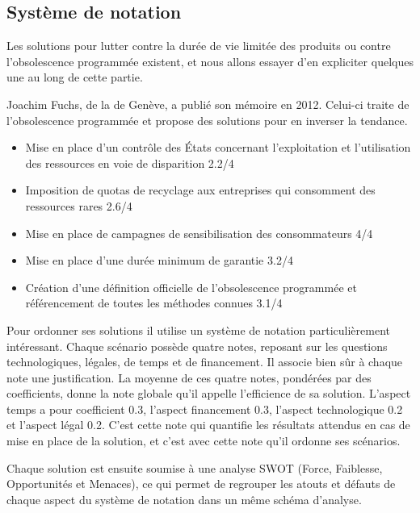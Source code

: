 \subsection{Système de notation}

Les solutions pour lutter contre la durée de vie limitée des produits ou contre l’obsolescence programmée existent, et nous allons essayer d’en expliciter quelques une au long de  cette partie.

Joachim Fuchs, de la  de Genève, a publié son mémoire en 2012. Celui-ci traite de l'obsolescence programmée et propose des solutions pour en inverser la tendance.

\begin{itemize}
\item Mise en place d’un contrôle des États concernant l’exploitation et l’utilisation des ressources en voie de disparition 2.2/4
\item Imposition de quotas de recyclage aux entreprises qui consomment des ressources rares 2.6/4
\item Mise en place de campagnes de sensibilisation des consommateurs 4/4
\item Mise en place d’une durée minimum de garantie 3.2/4
\item Création d’une définition officielle de l’obsolescence programmée et référencement de toutes les méthodes connues 3.1/4
\end{itemize}

Pour ordonner ses solutions il utilise un système de notation particulièrement intéressant. Chaque scénario possède quatre notes, reposant sur les questions technologiques, légales, de temps et de financement. Il associe bien sûr à chaque note une justification.
La moyenne de ces quatre notes, pondérées par des coefficients, donne la note globale qu’il appelle l’efficience de sa solution. L’aspect temps a pour coefficient 0.3, l’aspect financement 0.3, l’aspect technologique 0.2 et l’aspect légal 0.2. C’est cette note qui quantifie les résultats attendus en cas de mise en place de la solution, et c’est avec cette note qu’il ordonne ses scénarios.

Chaque solution est ensuite soumise à une analyse SWOT (Force, Faiblesse, Opportunités et Menaces), ce qui permet de regrouper les atouts et défauts de chaque aspect du système de notation dans un même schéma d’analyse. 
